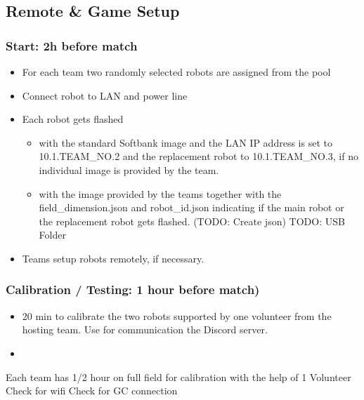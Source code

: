 \subsection{Remote \& Game Setup}

\subsubsection{Start: 2h before match}

    \begin{itemize}
        \item For each team two randomly selected robots are assigned from the pool
        \item Connect robot to LAN and power line
        \item Each robot gets flashed 
        \begin{itemize}
            \item with the standard Softbank image and the LAN IP address is set to 10.1.TEAM\_NO.2 and the replacement robot to 10.1.TEAM\_NO.3, if no individual image is provided by the team.
            \item with the image provided by the teams together with the field\_dimension.json and robot\_id.json indicating if the main robot or the replacement robot gets flashed. (TODO: Create json) TODO: USB Folder
        \end{itemize}
        \item Teams setup robots remotely, if necessary.
    \end{itemize}

\subsubsection{Calibration / Testing: 1 hour before match)}

    \begin{itemize}
        \item 20 min to calibrate the two robots supported by one volunteer from the hosting team. Use for communication the Discord server.
        \item  
    \end{itemize}

    Each team has 1/2 hour on full field for calibration with the help of 1 Volunteer
    Check for wifi
    Check for GC connection

